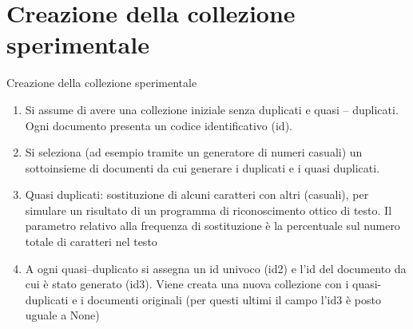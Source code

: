 \documentclass[10pt]{beamer}
\begin{document}
\section{Creazione della collezione sperimentale}
\begin{frame}{Creazione della collezione sperimentale}
\begin{enumerate}
	\item Si assume di avere una collezione iniziale senza duplicati e quasi – duplicati. Ogni documento presenta un codice identificativo (id).
	\item Si seleziona (ad esempio tramite un generatore di numeri casuali) un sottoinsieme di documenti da cui generare i duplicati e i quasi duplicati.
	\item Quasi duplicati: sostituzione di alcuni caratteri con altri (casuali), per simulare un risultato di un programma di riconoscimento ottico di testo. Il parametro relativo alla frequenza di sostituzione è la percentuale sul numero totale di caratteri nel testo
	\item A ogni quasi–duplicato si assegna un id univoco (id2) e l’id del documento da cui è stato generato (id3). Viene creata una nuova collezione con i quasi-duplicati e i documenti originali (per questi ultimi il campo l’id3 è posto uguale a None)
\end{enumerate}

\begin{center}
\end{center}
\end{frame}
\end{document}
